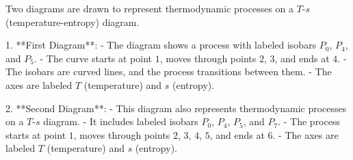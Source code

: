 Two diagrams are drawn to represent thermodynamic processes on a \( T \)-\( s \) (temperature-entropy) diagram.  

1. **First Diagram**:  
   - The diagram shows a process with labeled isobars \( P_0 \), \( P_4 \), and \( P_5 \).  
   - The curve starts at point \( 1 \), moves through points \( 2 \), \( 3 \), and ends at \( 4 \).  
   - The isobars are curved lines, and the process transitions between them.  
   - The axes are labeled \( T \) (temperature) and \( s \) (entropy).  

2. **Second Diagram**:  
   - This diagram also represents thermodynamic processes on a \( T \)-\( s \) diagram.  
   - It includes labeled isobars \( P_0 \), \( P_4 \), \( P_5 \), and \( P_7 \).  
   - The process starts at point \( 1 \), moves through points \( 2 \), \( 3 \), \( 4 \), \( 5 \), and ends at \( 6 \).  
   - The axes are labeled \( T \) (temperature) and \( s \) (entropy).
